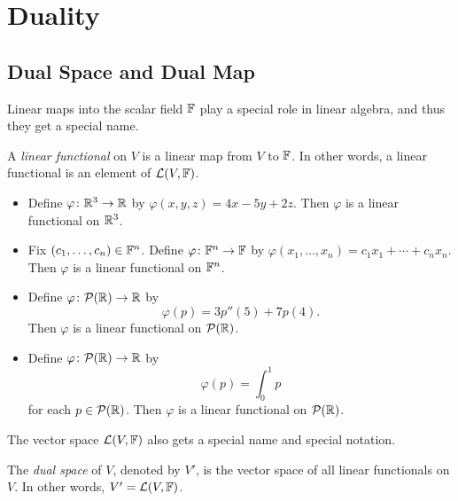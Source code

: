 \iftestbuild %
\setcounter{section}{5}\setcounter{theorem}{107}
\fi %
\section{Duality}

\subsection{Dual Space and Dual Map}

Linear maps into the scalar field $\mathbb{F}$ play a special role in linear algebra, and
thus they get a special name.

\begin{definition}\label{ax:3.108}
A \emph{linear functional} on $V$ is a linear map from $V$ to $\mathbb{F}$. In other
words, a linear functional is an element of $\mathcal{L}(V,\mathbb{F})$.
\end{definition}

\begin{example}\label{ax:3.109}\leavevmode
\begin{itemize}
\item Define $\varphi\colon\mathbb{R}^3\to\mathbb{R}$ by $\varphi(x,y,z)=4x-5y+2z$. Then
  $\varphi$ is a linear functional on $\mathbb{R}^3$.
\item Fix $(c_1,\dots,c_n)\in\mathbb{F}^n$. Define $\varphi\colon\mathbb{F}^n\to\mathbb{F}$ by
  $\varphi(x_1,\dots,x_n)=c_1x_1+\cdots+c_nx_n$. Then $\varphi$ is a linear
  functional on $\mathbb{F}^n$.
\item Define $\varphi\colon\mathcal{P}(\mathbb{R})\to\mathbb{R}$ by
  \[ \varphi(p) = 3p''(5)+7p(4). \]
  Then $\varphi$ is a linear functional on $\mathcal{P}(\mathbb{R})$.
\item Define $\varphi\colon\mathcal{P}(\mathbb{R})\to\mathbb{R}$ by
  \[ \varphi(p) = \int_0^1 p \]
  for each $p\in\mathcal{P}(\mathbb{R})$. Then $\varphi$ is a linear functional on
  $\mathcal{P}(\mathbb{R})$.
\end{itemize}
\end{example}

The vector space $\mathcal{L}(V,\mathbb{F})$ also gets a special name and special notation.

\begin{definition}\label{ax:3.110}
The \emph{dual space} of $V$, denoted by $V'$, is the vector space of all linear
functionals on $V$. In other words, $V'=\mathcal{L}(V,\mathbb{F})$.
\end{definition}

